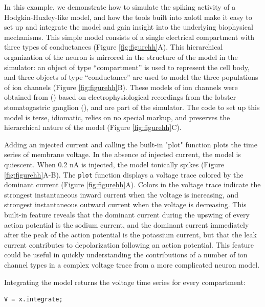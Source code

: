 \documentclass{frontiersSCNS} %
\begin{document}
In this example, we demonstrate how to simulate the spiking activity of a Hodgkin-Huxley-like model, and how the tools built into xolotl make it easy to set up and integrate the model and gain insight into the underlying biophysical mechanisms. This simple model consists of a single electrical compartment with three types of conductances (Figure \ref{fig:figurehh}A). This hierarchical organization of the neuron is mirrored in the structure of the model in the simulator: an object of type ``compartment'' is used to represent the cell body, and three objects of type ``conductance'' are used to model the three populations of ion channels (Figure \ref{fig:figurehh}B). These models of ion channels were obtained from (\cite{liuModelNeuronActivityDependent1998}) based on electrophysiological recordings from the lobster stomatogastric ganglion (\cite{turrigianoSelectiveRegulationCurrent1995}), and are part of the simulator. The code to set up this model is terse, idiomatic, relies on no special markup, and preserves the hierarchical nature of the model (Figure \ref{fig:figurehh}C).

Adding an injected current and calling the built-in "plot" function plots the time series of membrane voltage. In the absence of injected current, the model is quiescent. When 0.2 nA is injected, the model tonically spikes (Figure \ref{fig:figurehh}A-B).  The \texttt{plot} function displays a voltage trace colored by the dominant current (Figure \ref{fig:figurehh}A). Colors in the voltage trace indicate the strongest instantaneous inward current when the voltage is increasing, and strongest instantaneous outward current when the voltage is decreasing. This built-in feature reveals that the dominant current during the upswing of every action potential is the sodium current, and the dominant current immediately after the peak of the action potential is the potassium current, but that the leak current contributes to depolarization following an action potential. This feature could be useful in quickly understanding the contributions of a number of ion channel types in a complex voltage trace from a more complicated neuron model.

Integrating the model returns the voltage time series for every compartment:

\begin{lstlisting}[style=Matlab-editor]
V = x.integrate;
\end{lstlisting}
\end{document}
